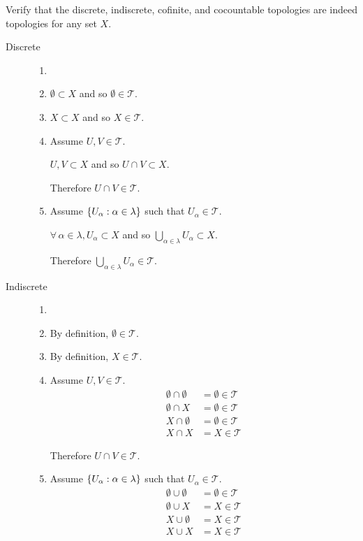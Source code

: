 \documentclass[letterpaper,12pt,fleqn]{article}
\newcommand{\T}{\mathscr{T}}
\renewcommand{\a}{\alpha}
\renewcommand{\l}{\lambda}
\begin{document}
\begin{example}
  Verify that the discrete, indiscrete, cofinite, and cocountable topologies are indeed topologies for any set \(X\).

  \begin{description}
  \item[Discrete]
    \begin{enumerate}
    \item[]
    \item \(\emptyset\subset X\) and so \(\emptyset\in\T\).

    \item \(X\subset X\) and so \(X\in\T\).

    \item Assume \(U,V\in\T\).

      \(U,V\subset X\) and so \(U\cap V\subset X\).

      Therefore \(U\cap V\in\T\).

    \item Assume \(\set{U_{\a}:\a\in\l}\) such that \(U_{\a}\in\T\).

      \(\forall\,\a\in\l,U_{\a}\subset X\) and so \(\bigcup_{\a\in\l}U_{\a}\subset X\).

      Therefore \(\bigcup_{\a\in\l}U_{\a}\in\T\).
    \end{enumerate}

  \item[Indiscrete]
    \begin{enumerate}
    \item[]
    \item By definition, \(\emptyset\in\T\).

    \item By definition, \(X\in\T\).

    \item Assume \(U,V\in\T\).
      \begin{align*}
        \emptyset\cap\emptyset &= \emptyset\in\T \\
        \emptyset\cap X &= \emptyset\in\T \\
        X\cap\emptyset &= \emptyset\in\T \\
        X\cap X &= X\in\T
      \end{align*}

      Therefore \(U\cap V\in\T\).

    \item Assume \(\set{U_{\a}:\a\in\l}\) such that \(U_{\a}\in\T\).
      \begin{align*}
        \emptyset\cup\emptyset &= \emptyset\in\T \\
        \emptyset\cup X &= X\in\T \\
        X\cup\emptyset &= X\in\T \\
        X\cup X &= X\in\T
      \end{align*}


\end{enumerate}
\end{description}
\end{example}
\end{document}

